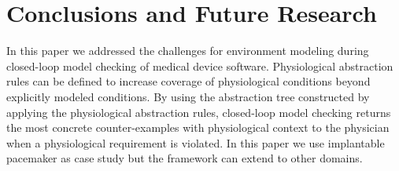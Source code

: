 \section{Conclusions and Future Research}
\label{conclusions}
In this paper we addressed the challenges for environment modeling during closed-loop model checking of medical device software. Physiological abstraction rules can be defined to increase coverage of physiological conditions beyond explicitly modeled conditions. By using the abstraction tree constructed by applying the physiological abstraction rules, closed-loop model checking returns the most concrete counter-examples with physiological context to the physician when a physiological requirement is violated. In this paper we use implantable pacemaker as case study but the framework can extend to other domains.

